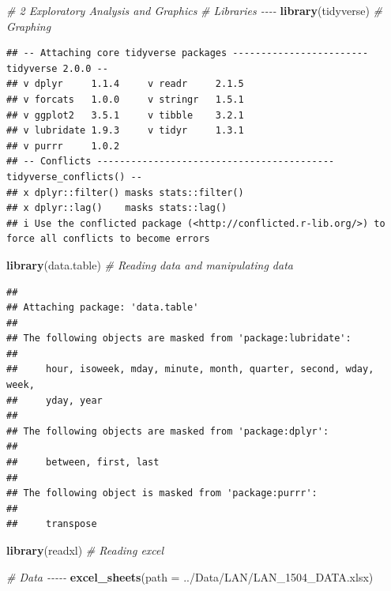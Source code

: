 \documentclass[
]{book}
\newenvironment{Shaded}{\begin{snugshade}}{\end{snugshade}}
\newcommand{\AttributeTok}[1]{\textcolor[rgb]{0.13,0.29,0.53}{#1}}
\newcommand{\CommentTok}[1]{\textcolor[rgb]{0.56,0.35,0.01}{\textit{#1}}}
\newcommand{\FunctionTok}[1]{\textcolor[rgb]{0.13,0.29,0.53}{\textbf{#1}}}
\newcommand{\NormalTok}[1]{#1}
\newcommand{\StringTok}[1]{\textcolor[rgb]{0.31,0.60,0.02}{#1}}
\begin{document}
\begin{Shaded}
\begin{Highlighting}[]
\CommentTok{\# 2 Exploratory Analysis and Graphics}
\CommentTok{\# Libraries {-}{-}{-}{-}}
\FunctionTok{library}\NormalTok{(tidyverse) }\CommentTok{\# Graphing }
\end{Highlighting}
\end{Shaded}

\begin{verbatim}
## -- Attaching core tidyverse packages ------------------------ tidyverse 2.0.0 --
## v dplyr     1.1.4     v readr     2.1.5
## v forcats   1.0.0     v stringr   1.5.1
## v ggplot2   3.5.1     v tibble    3.2.1
## v lubridate 1.9.3     v tidyr     1.3.1
## v purrr     1.0.2     
## -- Conflicts ------------------------------------------ tidyverse_conflicts() --
## x dplyr::filter() masks stats::filter()
## x dplyr::lag()    masks stats::lag()
## i Use the conflicted package (<http://conflicted.r-lib.org/>) to force all conflicts to become errors
\end{verbatim}

\begin{Shaded}
\begin{Highlighting}[]
\FunctionTok{library}\NormalTok{(data.table) }\CommentTok{\# Reading data and manipulating data}
\end{Highlighting}
\end{Shaded}

\begin{verbatim}
## 
## Attaching package: 'data.table'
## 
## The following objects are masked from 'package:lubridate':
## 
##     hour, isoweek, mday, minute, month, quarter, second, wday, week,
##     yday, year
## 
## The following objects are masked from 'package:dplyr':
## 
##     between, first, last
## 
## The following object is masked from 'package:purrr':
## 
##     transpose
\end{verbatim}

\begin{Shaded}
\begin{Highlighting}[]
\FunctionTok{library}\NormalTok{(readxl) }\CommentTok{\# Reading excel}

\CommentTok{\# Data {-}{-}{-}{-}{-}}
\FunctionTok{excel\_sheets}\NormalTok{(}\AttributeTok{path =} \StringTok{\textquotesingle{}../Data/LAN/LAN\_1504\_DATA.xlsx\textquotesingle{}}\NormalTok{)}
\end{Highlighting}
\end{Shaded}
\end{document}
